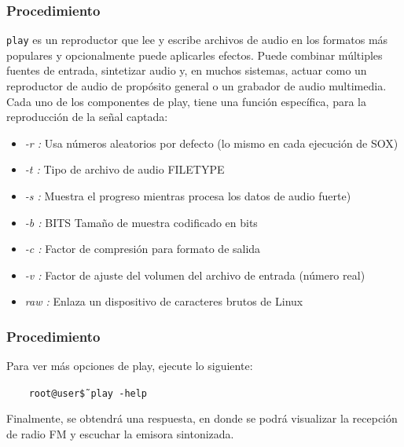 \begin{frame}
\frametitle{Procedimiento}

\texttt{play} es un reproductor que lee y escribe archivos de audio en los formatos más populares y opcionalmente puede aplicarles efectos. Puede combinar múltiples fuentes de entrada, sintetizar audio y, en muchos sistemas, actuar como un reproductor de audio de propósito general o un grabador de audio multimedia. \\
\vspace{2mm }
Cada uno de los componentes de play, tiene una función específica, para la reproducción de la señal captada:

\begin{itemize}
    \item {\textit{-r : } Usa números aleatorios por defecto (lo mismo en cada ejecución de SOX)}
    \item {\textit{-t : } Tipo de archivo de audio FILETYPE}
    \item {\textit{-s : } Muestra el progreso mientras procesa los datos de audio fuerte)}
    \item {\textit{-b : } BITS Tamaño de muestra codificado en bits}
    \item {\textit{-c : } Factor de compresión para formato de salida}
    \item {\textit{-v : } Factor de ajuste del volumen del archivo de entrada (número real)}
    \item {\textit{raw : } Enlaza un dispositivo de caracteres brutos de Linux}
\end{itemize}


\end{frame}

\begin{frame}
\frametitle{Procedimiento}

Para ver más opciones de play, ejecute lo siguiente:

\begin{block}{}
  \texttt{
  \ \ \ root@user\~\$ play {-}help}
\end{block} 

Finalmente, se obtendrá una respuesta, en donde se podrá visualizar la recepción de radio FM y escuchar la emisora sintonizada.

\end{frame}

